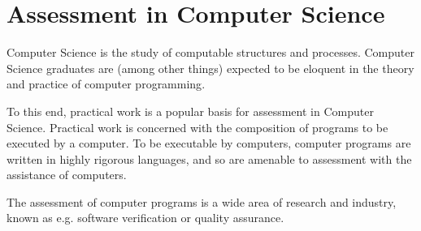 
\section{Assessment in Computer Science}

Computer Science is the study of computable structures and processes. Computer
Science graduates are (among other things) expected to be eloquent in the
theory and practice of computer programming\cite{cs-curricula-2013}.

To this end, practical work is a popular basis for assessment in Computer
Science\cite{carter-et-al-2003}. Practical work is concerned with the
composition of programs to be executed by a computer. To be executable by
computers, computer programs are written in highly rigorous languages, and so
are amenable to assessment with the assistance of computers.

The assessment of computer programs is a wide area of research and industry,
known as e.g. software verification or quality assurance.

